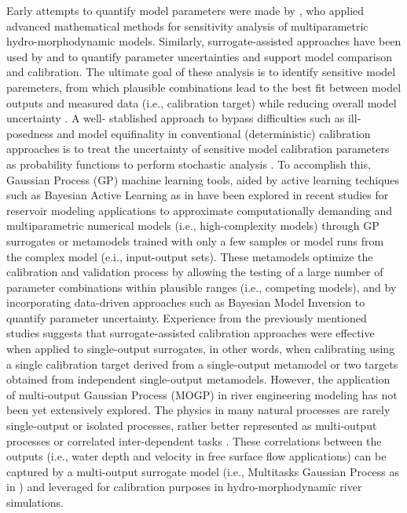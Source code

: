 \documentclass[draft,linenumbers,onecolumn]{agujournal2019} %
\begin{document}
Early attempts to quantify model parameters were made by , who applied advanced mathematical methods for sensitivity analysis of multiparametric hydro-morphodynamic models. Similarly, surrogate-assisted approaches have been used by   and  to quantify parameter uncertainties and support model comparison and calibration. The ultimate goal of these analysis is to identify sensitive model paremeters, from which plausible combinations lead to the best fit between model outputs and measured data (i.e., calibration target) while reducing overall model uncertainty \cite{oberkampf2004verification}. A well- stablished approach to bypass difficulties such as ill-posedness and model equifinality in conventional (deterministic) calibration approaches is to treat the uncertainty of sensitive model calibration parameters as probability functions to perform stochastic analysis \cite{kim2016stepwise}. To accomplish this, Gaussian Process (GP) machine learning tools, aided by active learning techiques such as Bayesian Active Learning as in   have been explored in recent studies for reservoir modeling applications \cite{schwindt2023bayesian, mouris2023stability} to approximate computationally demanding and multiparametric numerical models (i.e., high-complexity models) through GP surrogates or metamodels trained with only a few samples or model runs from the complex model (e.i., input-output sets). These metamodels optimize the calibration and validation process by allowing the testing of a large number of parameter combinations within plausible ranges (i.e., competing models), and by incorporating data-driven approaches such as Bayesian Model Inversion \cite{mohammadi2018bayesian} to quantify parameter uncertainty. Experience from the previously mentioned studies suggests that surrogate-assisted calibration approaches were effective when applied to single-output surrogates, in other words, when calibrating using a single calibration target derived from a single-output metamodel or two targets obtained from independent single-output metamodels.  However, the application of multi-output Gaussian Process (MOGP) in river engineering modeling has not been yet extensively explored. The physics in many natural processes are rarely single-output or isolated processes, rather better represented as multi-output processes \cite{ferreira2022multioutput} or correlated inter-dependent tasks \cite{bonilla2007multitask}. These correlations between the outputs (i.e., water depth and velocity in free surface flow applications) can be captured by a multi-output surrogate model (i.e., Multitasks Gaussian Process as in \cite{bonilla2007multitask}) and leveraged for calibration purposes in hydro-morphodynamic river simulations. 
\end{document}
